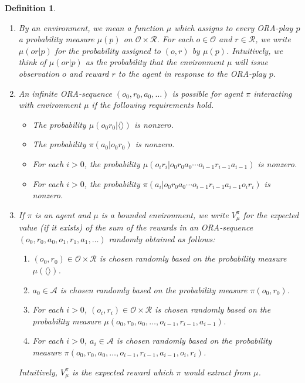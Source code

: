 \documentclass{article}
\newtheorem{definition}[theorem]{Definition}
\begin{document}
\begin{definition}
\begin{enumerate}
        will take action $a$ in response to the ORA-prompt $p$.
        \item
        By an \emph{environment}, we mean a function $\mu$
        which assigns to every ORA-play $p$ a probability measure $\mu(p)$
        on $\mathcal O\times\mathcal R$.
        For each $o\in\mathcal O$ and $r\in\mathcal R$, we write $\mu(or|p)$
        for the probability assigned to $(o,r)$ by $\mu(p)$.
        Intuitively, we think of $\mu(or|p)$ as the probability that the environment
        $\mu$ will issue observation $o$ and reward $r$ to the agent in response
        to the ORA-play $p$.
        \item
        An infinite ORA-sequence $(o_0,r_0,a_0,\ldots)$ is \emph{possible for agent
        $\pi$ interacting with environment $\mu$} if the following requirements hold.
        \begin{itemize}
            \item The probability $\mu(o_0r_0|\langle\rangle)$ is nonzero.
            \item The probability $\pi(a_0|o_0r_0)$ is nonzero.
            \item For each $i>0$, the probability
                $\mu(o_ir_i|o_0r_0a_0\cdots o_{i-1}r_{i-1}a_{i-1})$ is nonzero.
            \item For each $i>0$, the probability
                $\pi(a_i|o_0r_0a_0\cdots o_{i-1}r_{i-1}a_{i-1}o_ir_i)$ is nonzero.
        \end{itemize}
        \item
        If $\pi$ is an agent and $\mu$ is a bounded environment,
        we write $V^\pi_\mu$ for the expected value (if it exists)
        of the sum of the rewards in an
        ORA-sequence $(o_0,r_0,a_0,o_1,r_1,a_1,\ldots)$ randomly obtained as follows:
        \begin{enumerate}
            \item $(o_0,r_0)\in \mathcal O\times\mathcal R$ is chosen randomly based
            on the probability measure $\mu(\langle\rangle)$.
            \item $a_0\in\mathcal A$ is chosen randomly based on the probability
            measure $\pi(o_0,r_0)$.
            \item
            For each $i>0$,
            $(o_i,r_i)\in\mathcal O\times\mathcal R$ is chosen randomly based on
            the probability measure $\mu(o_0,r_0,a_0,\ldots,o_{i-1},r_{i-1},a_{i-1})$.
            \item
            For each $i>0$,
            $a_i\in\mathcal A$ is chosen randomly based on the probability measure
            $\pi(o_0,r_0,a_0,\ldots,o_{i-1},r_{i-1},a_{i-1},o_i,r_i)$.
        \end{enumerate}
        Intuitively, $V^\pi_\mu$ is the expected reward which $\pi$ would extract
        from $\mu$.
    \end{enumerate}
\end{definition}
\end{document}

